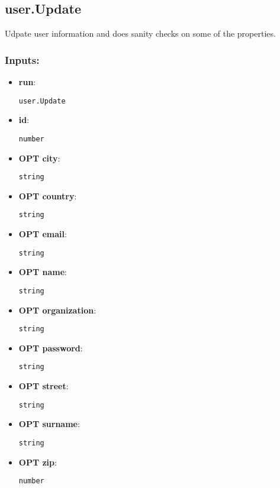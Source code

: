 \subsection{user.Update}
\label{ch:builtinservices:user.Update}
Udpate user information and does sanity checks on some of the properties.
\subsubsection*{Inputs:}
\begin{itemize}
    \item \textbf{run}: 
\begin{lstlisting}
user.Update
\end{lstlisting}
    \item \textbf{id}: 
\begin{lstlisting}
number
\end{lstlisting}
    \item \textbf{OPT city}: 
\begin{lstlisting}
string
\end{lstlisting}
    \item \textbf{OPT country}: 
\begin{lstlisting}
string
\end{lstlisting}
    \item \textbf{OPT email}: 
\begin{lstlisting}
string
\end{lstlisting}
    \item \textbf{OPT name}: 
\begin{lstlisting}
string
\end{lstlisting}
    \item \textbf{OPT organization}: 
\begin{lstlisting}
string
\end{lstlisting}
    \item \textbf{OPT password}: 
\begin{lstlisting}
string
\end{lstlisting}
    \item \textbf{OPT street}: 
\begin{lstlisting}
string
\end{lstlisting}
    \item \textbf{OPT surname}: 
\begin{lstlisting}
string
\end{lstlisting}
    \item \textbf{OPT zip}: 
\begin{lstlisting}
number
\end{lstlisting}
  \end{itemize}

